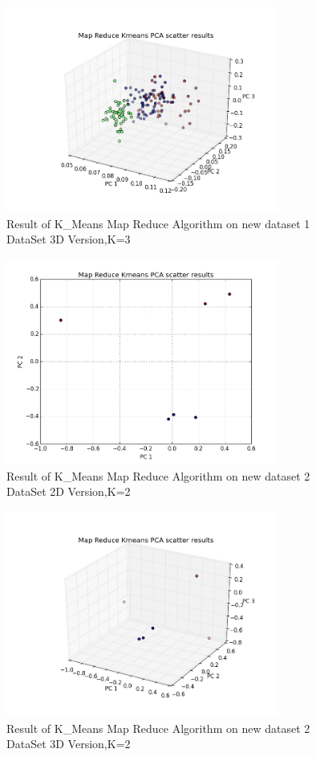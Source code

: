 \documentclass[paper=letter, fontsize=11pt]{article}
\numberwithin{equation}{section}		%
\numberwithin{figure}{section}			%
\numberwithin{table}{section}				%
\begin{document}
\begin{figure}[H]
	\centering
	\includegraphics[width=0.8\textwidth]{MP_new_dataset_1_3D}
	\caption{Result of K\_Means Map Reduce Algorithm on new dataset 1 DataSet 3D Version,K=3}
\end{figure}
\begin{figure}[H]
	\centering
	\includegraphics[width=0.8\textwidth]{MP_new_dataset_2_2D}
	\caption{Result of K\_Means Map Reduce Algorithm on new dataset 2 DataSet 2D Version,K=2}
\end{figure}
\begin{figure}[H]
	\centering
	\includegraphics[width=0.8\textwidth]{MP_new_dataset_2_3D}
	\caption{Result of K\_Means Map Reduce Algorithm on new dataset 2 DataSet 3D Version,K=2}
\end{figure}
\end{document}
